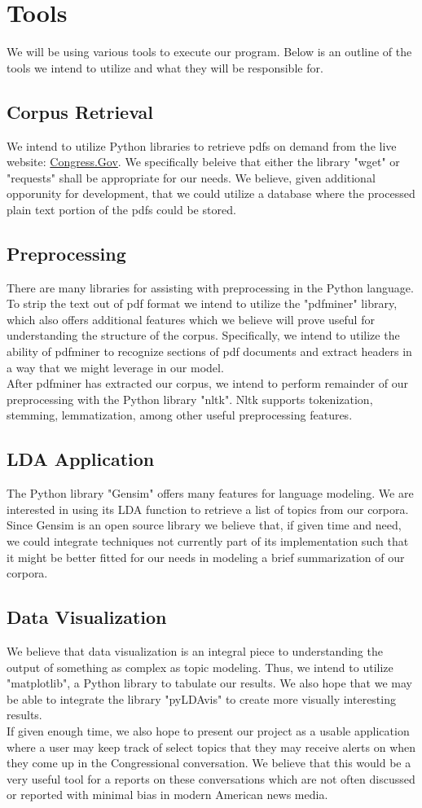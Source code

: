 \documentclass[11pt,a4paper]{article}
\begin{document}
\section{Tools}
We will be using various tools to execute our program. Below is an outline of the tools we intend to utilize and what they will be responsible for.
\subsection{Corpus Retrieval}
We intend to utilize Python libraries to retrieve pdfs on demand from the live website: \url{Congress.Gov}. We specifically beleive that either the library "wget" or "requests" shall be appropriate for our needs. We believe, given additional opporunity for development, that we could utilize a database where the processed plain text portion of the pdfs could be stored.
\subsection{Preprocessing}
There are many libraries for assisting with preprocessing in the Python language. To strip the text out of pdf format we intend to utilize the "pdfminer" library, which also offers additional features which we believe will prove useful for understanding the structure of the corpus. Specifically, we intend to utilize the ability of pdfminer to recognize sections of pdf documents and extract headers in a way that we might leverage in our model.\\
After pdfminer has extracted our corpus, we intend to perform remainder of our preprocessing with the Python library "nltk". Nltk supports tokenization, stemming, lemmatization, among other useful preprocessing features.
\subsection{LDA Application}
 The Python library "Gensim" offers many features for language modeling. We are interested in using its LDA function to retrieve a list of topics from our corpora. Since Gensim is an open source library we believe that, if given time and need, we could integrate techniques not currently part of its implementation such that it might be better fitted for our needs in modeling a brief summarization of our corpora.
 \subsection{Data Visualization}
  We believe that data visualization is an integral piece to understanding the output of something as complex as topic modeling. Thus, we intend to utilize "matplotlib", a Python library to tabulate our results. We also hope that we may be able to integrate the library "pyLDAvis" to create more visually interesting results.\\
  If given enough time, we also hope to present our project as a usable application where a user may keep track of select topics that they may receive alerts on when they come up in the Congressional conversation. We believe that this would be a very useful tool for a reports on these conversations which are not often discussed or reported with minimal bias in modern American news media.
  

\footnotesize

\end{document}
